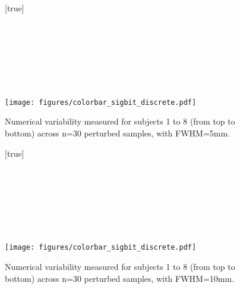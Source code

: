 \documentclass[lettersize,journal]{IEEEtran}
\begin{document}
\begin{landscape}
    \begin{figure}
        \vspace*{-2cm}
        \centering
        [true] \\
         \\
         \\
         \\
         \\
         \\
         \\
         \\
        \texttt{[image: figures/colorbar\_sigbit\_discrete.pdf]}
        \caption{Numerical variability measured for subjects 1 to 8 (from top to bottom) across n=30 perturbed samples, with FWHM=5mm. }
        \label{fig:uncertainty-maps-5mm-disc}
    \end{figure}
\end{landscape}

\begin{landscape}
    \begin{figure}
        \vspace*{-2cm}
        \centering
        [true] \\
         \\
         \\
         \\
         \\
         \\
         \\
         \\
        \texttt{[image: figures/colorbar\_sigbit\_discrete.pdf]}
        \caption{Numerical variability measured for subjects 1 to 8 (from top to bottom) across n=30 perturbed samples, with FWHM=10mm. }
        \label{fig:uncertainty-maps-10mm-disc}
    \end{figure}
\end{landscape}
\end{document}
